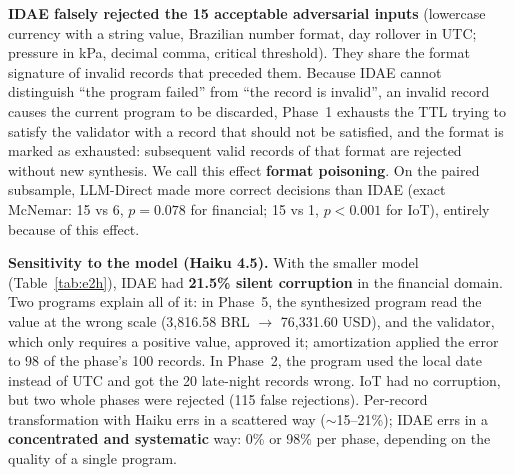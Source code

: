 \documentclass[sigconf,nonacm]{acmart}
\begin{document}
\textbf{IDAE falsely rejected the 15 acceptable adversarial inputs} (lowercase currency with a string value, Brazilian number format, day rollover in UTC; pressure in kPa, decimal comma, critical threshold). They share the format signature of invalid records that preceded them. Because IDAE cannot distinguish ``the program failed'' from ``the record is invalid'', an invalid record causes the current program to be discarded, Phase~1 exhausts the TTL trying to satisfy the validator with a record that should not be satisfied, and the format is marked as exhausted: subsequent valid records of that format are rejected without new synthesis. We call this effect \textbf{format poisoning}. On the paired subsample, LLM-Direct made more correct decisions than IDAE (exact McNemar: 15 vs 6, $p = 0.078$ for financial; 15 vs 1, $p < 0.001$ for IoT), entirely because of this effect.

\textbf{Sensitivity to the model (Haiku 4.5).} With the smaller model (Table~\ref{tab:e2h}), IDAE had \textbf{21.5\% silent corruption} in the financial domain. Two programs explain all of it: in Phase~5, the synthesized program read the value at the wrong scale (3,816.58 BRL $\to$ 76,331.60 USD), and the validator, which only requires a positive value, approved it; amortization applied the error to 98 of the phase's 100 records. In Phase~2, the program used the local date instead of UTC and got the 20 late-night records wrong. IoT had no corruption, but two whole phases were rejected (115 false rejections). Per-record transformation with Haiku errs in a scattered way ($\sim$15--21\%); IDAE errs in a \textbf{concentrated and systematic} way: 0\% or 98\% per phase, depending on the quality of a single program.

\begin{table}[h]
\caption{E2 --- Haiku 4.5 (same streams and subsamples)}
\label{tab:e2h}
\end{table}
\end{document}
